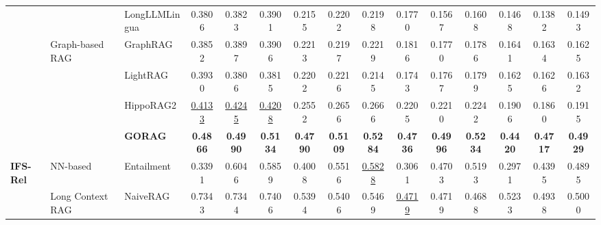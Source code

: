 \begin{table}[t]
{\begin{tabular}{l|l|l|ccc|ccc|ccc|ccc}
			
			&   & LongLLMLingua        \cite{jiang-etal-2024-longllmlingua}            & 0.3806          &          0.3823       &       0.3901           & 0.2155          &          0.2202       &      0.2198            & 0.1770          &        0.1567        &       0.1608        & 0.1468          &         0.1382       &       0.1493            \\ \cline{2-15}
			&                 \multirow{4}{*}{Graph-based RAG}                      & GraphRAG       \cite{edge2024local}                  & 0.3852          & 0.3897          & 0.3906           & 0.2213          & 0.2197          & 0.2219           & 0.1816          & 0.1770          & 0.1786           & 0.1641          & 0.1634          & 0.1625            \\
			&                                     & LightRAG      \cite{guo2024lightrag}                   & {0.3930}          & 0.3806          & 0.3815           & 0.2202          & 0.2216          & 0.2145           & 0.1743          & 0.1767          & 0.1799           & 0.1625          & 0.1626          & 0.1632            \\
			&                                     & HippoRAG2    \cite{gutiérrez2025ragmemory}               &  \underline{0.4133}    &     \underline{0.4245}   &   \underline{0.4208}     &  0.2552    &    0.2656  &     0.2666    &    0.2205  &  0.2210  &   0.2242   &  0.1906     &   0.1860 &      0.1915    \\
			&                                     & \textbf{GORAG}                   &     \textbf{0.4866}            &        \textbf{0.4990}            &    \textbf{0.5134}              &       \textbf{0.4790}           &        \textbf{0.5109}            &        \textbf{0.5284}          &            \textbf{0.4736}      &       \textbf{0.4996}          &     \textbf{0.5234}              &          \textbf{0.4420}        &         \textbf{0.4717}         &       \textbf{0.4929}             \\ 
			\hline\hline
			
			
			
		
			
			
			
			
			
			\multirow{7}{*}{\textbf{IFS-Rel} } & \multirow{1}{*}{NN-based}           & Entailment          \cite{xia-etal-2021-incremental}           & 0.3391          & {0.6046}          & {0.5859}           & {0.4008}          & {0.5516}          & \underline{0.5828}           & {0.3061}          & {0.4703}          & {0.5193}           & {0.2971}          & {0.4395}          & {0.4895}            \\\cline{2-15}
			& \multirow{2}{*}{Long Context RAG}   & NaiveRAG        \cite{gao2023retrieval}               &{0.7343}          & 0.7344          & 0.7406           & 0.5394          & 0.5406          & 0.5469           & \underline{0.4719}          & 0.4719          & 0.4688           & 0.5233          & {0.4938}         & 0.5000            \\
		

\end{tabular}}
\end{table}
